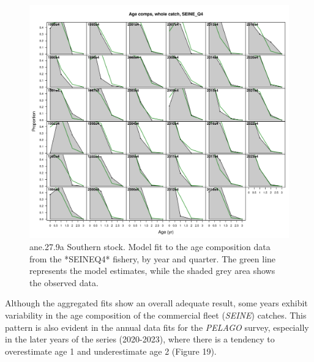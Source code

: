 \documentclass[
]{article}
\begin{document}
\begin{figure}[H]

{\centering \includegraphics[width=0.95\linewidth]{report/run/S1.0_4FLEETS_SelECO_RecIndex_Mnewfix/fig_age_fit_SeineQ4} 

}

\caption{ane.27.9a Southern stock. Model fit to the age composition data from the *SEINEQ4* fishery, by year and quarter. The green line represents the model estimates, while the shaded grey area shows the observed data.}\label{fig:unnamed-chunk-22}
\end{figure}

Although the aggregated fits show an overall adequate result, some years
exhibit variability in the age composition of the commercial fleet
(\emph{SEINE}) catches. This pattern is also evident in the annual data
fits for the \emph{PELAGO} survey, especially in the later years of the
series (2020-2023), where there is a tendency to overestimate age 1 and
underestimate age 2 (Figure 19).
\end{document}
